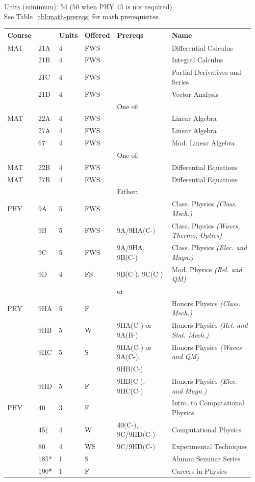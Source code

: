 \documentclass[12pt]{article}
\begin{document}
\newpage
\vskip 2cm
\vskip 0.25cm
\noindent
Units (minimum): 54 (50 when PHY 45 is not required)\\
See Table~\ref{tbl:math-prereqs} for math prerequisites.\\
\begin{tabular}{|llllll|}
\hline
Course & & Units & Offered & Prereqs & Name \\
\hline
MAT & 21A & 4 & FWS & & Differential Calculus\\ 
    & 21B & 4 & FWS &  & Integral Calculus \\ 
    & 21C & 4 & FWS &  & Partial Derivatives and Series\\ 
    & 21D & 4 & FWS &  & Vector Analysis\\
\hline
\hline
    & & & & One of: & \\
MAT & 22A     & 4 & FWS &  & Linear Algebra\\
    & 27A & 4 & FWS &  & Linear Algebra\\
    & 67  & 4 & FWS &  & Mod. Linear Algebra\\
\hline
\hline
    & & & & One of: & \\
MAT & 22B & 4 & FWS &  & Differential Equations\\
MAT & 27B & 4 & FWS &  & Differential Equations\\ 
\hline
\hline
   & & & & Either: & \\
PHY & 9A & 5 & FWS &            & Class. Physics {\it (Class. Mech.)}\\
    & 9B & 5 & FWS & 9A/9HA(C-)     & Class. Physics {\it (Waves, Thermo, Optics)}\\
    & 9C & 5 & FWS & 9A/9HA, 9B(C-)  & Class. Physics {\it (Elec. and Magn.)}\\ 
    & 9D & 4 & FS  & 9B(C-), 9C(C-)  & Mod. Physics {\it (Rel. and QM)}\\ 
\hline
&&&&or&\\
PHY & 9HA & 5 & F &  & Honors Physics {\it (Class. Mech.)}\\ 
    & 9HB & 5 & W & 9HA(C-) or 9A(B-)  & Honors Physics {\it (Rel. and Stat. Mech.)}\\ 
    & 9HC & 5 & S & 9HA(C-) or 9A(C-), & Honors Physics {\it (Waves and QM)}\\
    &     &   &   &  9HB(C-) & \\
    & 9HD & 5 & F & 9HB(C-), 9HC(C-)   & Honors Physics {\it (Elec. and Magn.)}\\ 
\hline
\hline
PHY & 40  & 3 & F & & Intro. to Computational Physics \\ 
    & 45$\ddagger$  & 4 & W & 40(C-), 9C/9HD(C-) & Computational Physics\\ 
    & 80  & 4 & WS & 9C/9HD(C-)         & Experimental Techniques \\
    & 185* & 1 & S & & Alumni Seminar Series \\ 
    & 190* & 1 & F & & Careers in Physics \\ 
\hline
\end{tabular}\\
\end{document}
